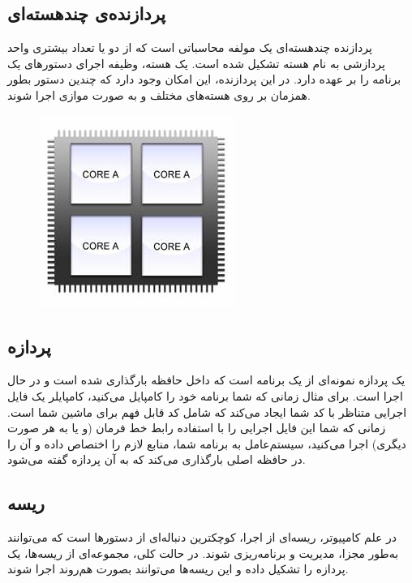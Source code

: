 \documentclass{utap}
\begin{document}
		\subsection{پردازنده‌ی چندهسته‌ای\protect{}} %
		\hspace{5mm}
پردازنده چند‌هسته‌ای یک مولفه محاسباتی  است که از دو یا تعداد بیشتری واحد پردازشی به نام هسته تشکیل شده است. یک هسته، وظیفه اجرای دستورهای یک برنامه را بر عهده دارد. در این پردازنده، این امکان وجود دارد که چندین دستور بطور همزمان بر روی هسته‌های مختلف و به صورت موازی اجرا شوند.
		\begin{figure}[H]
			\centering
			\includegraphics[width=0.30 \textwidth]{MultiCore.jpg}     
		\end{figure}
	
		\subsection{پردازه\protect{}} %
		\hspace{5mm}
	یک پردازه نمونه‌ای از یک برنامه است که داخل حافظه بارگذاری شده است و در حال اجرا است. برای مثال زمانی که شما برنامه‌ خود را کامپایل می‌کنید، کامپایلر یک فایل اجرایی متناظر با کد شما ایجاد می‌کند که شامل کد قابل فهم برای ماشین شما است. زمانی که شما این فایل اجرایی را با استفاده رابط خط فرمان (و یا به هر صورت دیگری) اجرا می‌کنید،‌ سیستم‌عامل به برنامه شما، منابع لازم را اختصاص داده و آن را در حافظه اصلی بارگذاری می‌کند که به آن پردازه گفته می‌شود.

		\subsection{ریسه\protect{}} %
		\hspace{5mm}
	در علم کامپیوتر، ریسه‌ای از اجرا، کوچکترین دنباله‌ای از دستورها است که می‌توانند به‌طور مجزا، مدیریت و برنامه‌ریزی شوند. در حالت کلی، مجموعه‌ای از ریسه‌ها، یک پردازه را تشکیل داده و این ریسه‌‌ها می‌توانند بصورت هم‌روند اجرا شوند.
	
\end{document}
